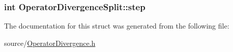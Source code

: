 \subsubsection[{step}]{\setlength{\rightskip}{0pt plus 5cm}int Operator\+Divergence\+Split\+::step}\label{struct_operator_divergence_split_add46415c643d7ba724e43bbd13628669}


The documentation for this struct was generated from the following file\+:\begin{DoxyCompactItemize}
\item 
source/\hyperlink{_operator_divergence_8h}{Operator\+Divergence.\+h}\end{DoxyCompactItemize}
